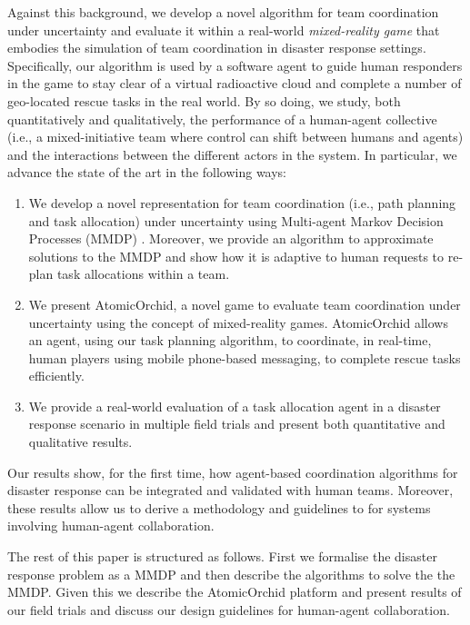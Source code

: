 Against this background, we develop a novel algorithm for team coordination under uncertainty and evaluate it within a real-world \emph{mixed-reality game} \cite{} that embodies the simulation of team coordination in disaster response settings. Specifically, our algorithm is used by a software agent to guide human responders in the game to stay clear of a virtual radioactive cloud and complete a number of geo-located rescue tasks in the real world. By so doing, we  study, both quantitatively and qualitatively, the performance of a human-agent collective (i.e., a mixed-initiative team where control can shift between humans and agents)  and the interactions between the different actors in the system. In particular, we  advance the state of the art in the following ways:
\begin{enumerate}
\item We develop a novel representation for team coordination (i.e., path planning and task allocation) under uncertainty using Multi-agent Markov Decision Processes (MMDP)  \cite{boutilier1996planning}. Moreover, we provide an algorithm to approximate solutions to the MMDP and show how it  is adaptive to human requests to re-plan task allocations within a team.
\item We present AtomicOrchid, a novel game to evaluate team coordination under uncertainty using the concept of mixed-reality games. AtomicOrchid allows an agent, using our task planning algorithm, to coordinate, in real-time, human players using mobile phone-based messaging, to complete rescue tasks efficiently.
\item We provide a real-world evaluation of a task allocation agent in a disaster response scenario in multiple field trials and present both quantitative and qualitative results. 
\end{enumerate}
Our results show, for the first time, how agent-based coordination algorithms for disaster response can be integrated and validated with human teams. Moreover, these results allow us to derive a methodology and guidelines to for systems involving  human-agent collaboration. 

The rest of this paper is structured as follows. First we  formalise the disaster response problem as a MMDP and then describe the algorithms to solve the the MMDP. Given this we describe the AtomicOrchid platform and present results of our field trials and discuss our design guidelines for human-agent collaboration.



